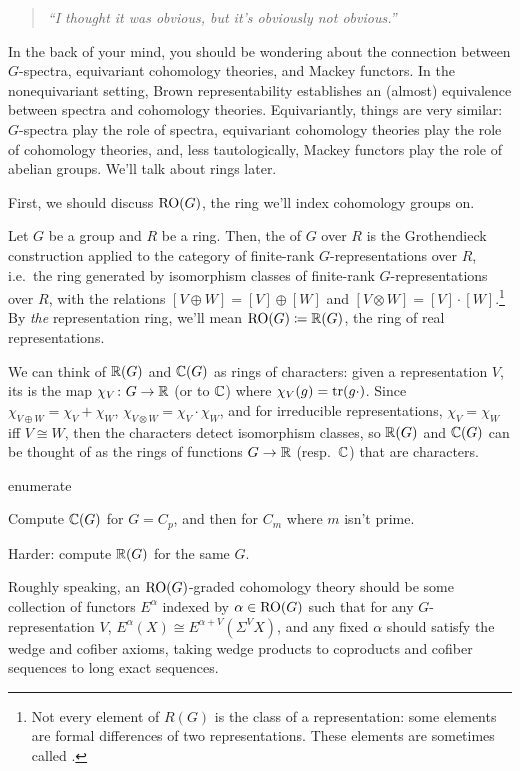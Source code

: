 \begin{quote}\textit{
	``I thought it was obvious, but it's obviously not obvious.''
}\end{quote}
In the back of your mind, you should be wondering about the connection between $G$-spectra, equivariant cohomology
theories, and Mackey functors. In the nonequivariant setting, Brown representability establishes an (almost)
equivalence between spectra and cohomology theories. Equivariantly, things are very similar: $G$-spectra play the
role of spectra, equivariant cohomology theories play the role of cohomology theories, and, less tautologically,
Mackey functors play the role of abelian groups. We'll talk about rings later.

First, we should discuss $\mathrm{RO}(G)$, the ring we'll index cohomology groups on.
\begin{defn}
Let $G$ be a group and $R$ be a ring. Then, the  of $G$ over $R$ is the Grothendieck
construction applied to the category of finite-rank $G$-representations over $R$, i.e.\ the ring generated by
isomorphism classes of finite-rank $G$-representations over $R$, with the relations $[V\oplus W] = [V]\oplus [W]$
and $[V\otimes W] = [V]\cdot [W]$.\footnote{Not every element of $R(G)$ is the class of a representation: some
elements are formal differences of two representations. These elements are sometimes called .} By \emph{the} representation ring, we'll mean $\mathrm{RO}(G)\coloneqq\mathbb R(G)$, the ring of real
representations.
\end{defn}
We can think of $\mathbb R(G)$ and $\mathbb C(G)$ as rings of characters: given a representation $V$, its  is the
map $\chi_V\colon G\to\mathbb R$ (or to $\mathbb C$) where $\chi_V(g) = \operatorname{tr}(g\cdot)$. Since $\chi_{V\oplus W} = \chi_V + \chi_W$,
$\chi_{V\otimes W} = \chi_V\cdot\chi_W$, and for irreducible representations, $\chi_V = \chi_W$ iff $V\cong W$,
then the characters detect isomorphism classes, so $\mathbb R(G)$ and $\mathbb C(G)$ can be thought of as the rings of functions
$G\to\mathbb R$ (resp.\ $\mathbb C$) that are characters.
\begin{comp}{ex}{enumerate}
	\item Compute $\mathbb C(G)$ for $G = C_p$, and then for $C_m$ where $m$ isn't prime.
	\item Harder: compute $\mathbb R(G)$ for the same $G$.
\end{comp}
Roughly speaking, an $\mathrm{RO}(G)$-graded cohomology theory should be some collection of functors $E^\alpha$ indexed by
$\alpha\in\mathrm{RO}(G)$ such that for any $G$-representation $V$, $E^\alpha(X) \cong E^{\alpha+V}(\Sigma^V X)$, and any
fixed $\alpha$ should satisfy the wedge and cofiber axioms, taking wedge products to coproducts and cofiber
sequences to long exact sequences.

